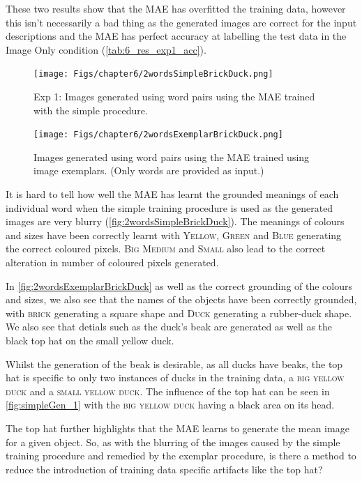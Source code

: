These two results show that the \ac{MAE} has overfitted the training data, however this isn't necessarily a bad thing as the generated images are correct for the input descriptions and the \ac{MAE} has perfect accuracy at labelling the test data in the Image Only condition (\autoref{tab:6_res_exp1_acc}).



\begin{figure}[ht]
    \centering
    \texttt{[image: Figs/chapter6/2wordsSimpleBrickDuck.png]}
    \caption{Exp 1: Images generated using word pairs using the MAE trained with the simple procedure.}
    \label{fig:2wordsSimpleBrickDuck}
\end{figure}

\begin{figure}[ht]
    \centering
    \texttt{[image: Figs/chapter6/2wordsExemplarBrickDuck.png]}
    \caption{Images generated using word pairs using the MAE trained using image exemplars. (Only words are provided as input.)}
    \label{fig:2wordsExemplarBrickDuck}
\end{figure}


It is hard to tell how well the \ac{MAE} has learnt the grounded meanings of each individual word when the simple training procedure is used as the generated images are very blurry (\autoref{fig:2wordsSimpleBrickDuck}). The meanings of colours and sizes have been correctly learnt with \textsc{Yellow}, \textsc{Green} and  \textsc{Blue} generating the correct coloured pixels. \textsc{Big} \textsc{Medium} and \textsc{Small} also lead to the correct alteration in number of coloured pixels generated.

In \autoref{fig:2wordsExemplarBrickDuck} as well as the correct grounding of the colours and sizes, we also see that the names of the objects have been correctly grounded, with \textsc{brick} generating a square shape and \textsc{Duck} generating a rubber-duck shape. We also see that detials such as the duck's beak are generated as well as the black top hat on the small yellow duck.

Whilst the generation of the beak is desirable, as all ducks have beaks, the top hat is specific to only two instances of ducks in the training data, a \textsc{big yellow duck} and a \textsc{small yellow duck}. The influence of the top hat can be seen in \autoref{fig:simpleGen_1} with the 
\textsc{big yellow duck} having a black area on its head.

The top hat further highlights that the \ac{MAE} learns to generate the mean image for a given object. So, as with the blurring of the images caused by the simple training procedure and remedied by the exemplar procedure, is there a method to reduce the introduction of training data specific artifacts like the top hat?

